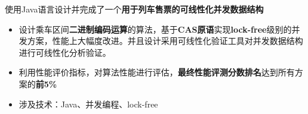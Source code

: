 \documentclass{resume}
\begin{document}
\begin{onehalfspacing}
  使用Java语言设计并完成了一个\textbf{用于列车售票的可线性化并发数据结构}
\begin{itemize}
  \item 设计乘车区间\textbf{二进制编码运算}的算法，基于\textbf{CAS原语}实现\textbf{lock-free}级别的并发方案，性能上大幅度改进。并且设计采用可线性化验证工具对并发数据结构进行可线性化分析验证。
  \item 利用性能评价指标，对算法性能进行评估，\textbf{最终性能评测分数排名}达到所有方案的\textbf{前5\%}
  \item 涉及技术：Java、并发编程、lock-free
\end{itemize}
\end{onehalfspacing}



\end{document}
